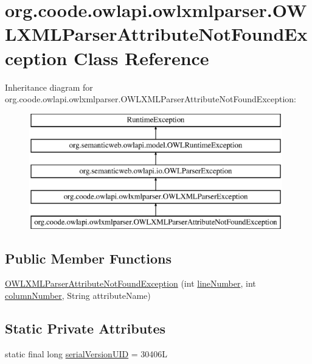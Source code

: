\hypertarget{classorg_1_1coode_1_1owlapi_1_1owlxmlparser_1_1_o_w_l_x_m_l_parser_attribute_not_found_exception}{\section{org.\-coode.\-owlapi.\-owlxmlparser.\-O\-W\-L\-X\-M\-L\-Parser\-Attribute\-Not\-Found\-Exception Class Reference}
\label{classorg_1_1coode_1_1owlapi_1_1owlxmlparser_1_1_o_w_l_x_m_l_parser_attribute_not_found_exception}
}
Inheritance diagram for org.\-coode.\-owlapi.\-owlxmlparser.\-O\-W\-L\-X\-M\-L\-Parser\-Attribute\-Not\-Found\-Exception\-:\begin{figure}[H]
\begin{center}
\leavevmode
\includegraphics[height=5.000000cm]{classorg_1_1coode_1_1owlapi_1_1owlxmlparser_1_1_o_w_l_x_m_l_parser_attribute_not_found_exception}
\end{center}
\end{figure}
\subsection*{Public Member Functions}
\begin{DoxyCompactItemize}
\item 
\hyperlink{classorg_1_1coode_1_1owlapi_1_1owlxmlparser_1_1_o_w_l_x_m_l_parser_attribute_not_found_exception_ab4105e9df491e06ed02f609bd93f87a4}{O\-W\-L\-X\-M\-L\-Parser\-Attribute\-Not\-Found\-Exception} (int \hyperlink{classorg_1_1semanticweb_1_1owlapi_1_1io_1_1_o_w_l_parser_exception_a5a5d515eefd8c2871627e152d86c03c2}{line\-Number}, int \hyperlink{classorg_1_1semanticweb_1_1owlapi_1_1io_1_1_o_w_l_parser_exception_af0ad50fb6962ba9b17a4e358e1b82d38}{column\-Number}, String attribute\-Name)
\end{DoxyCompactItemize}
\subsection*{Static Private Attributes}
\begin{DoxyCompactItemize}
\item 
static final long \hyperlink{classorg_1_1coode_1_1owlapi_1_1owlxmlparser_1_1_o_w_l_x_m_l_parser_attribute_not_found_exception_a7fc75a7e28b77c3333d1b398f35f5704}{serial\-Version\-U\-I\-D} = 30406\-L
\end{DoxyCompactItemize}


